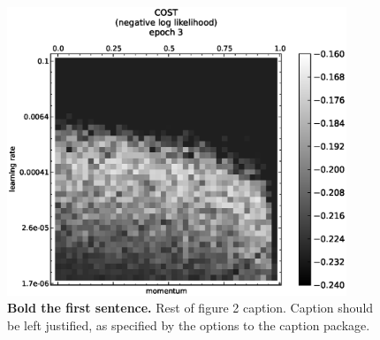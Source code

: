 \documentclass[10pt]{article}
\begin{document}
\begin{figure}[!ht]
\begin{center}
\includegraphics[width=4in]{plots/detailed/LF-20R10R-20T10-CIFAR-3.eps}
\end{center}
\caption{
{\bf Bold the first sentence.}  Rest of figure 2  caption.  Caption 
should be left justified, as specified by the options to the caption 
package.
}
\label{Figure_label}
\end{figure}
\end{document}
